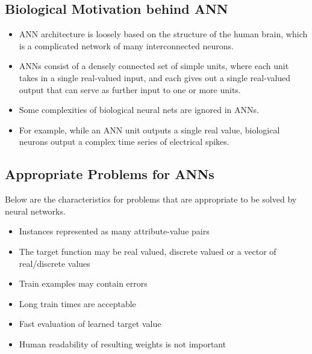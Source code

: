\documentclass{article}
\theoremstyle{plain}
\theoremstyle{definition}
\begin{document}
\subsection{Biological Motivation behind ANN}
\begin{itemize}
    \item ANN architecture is loosely based on the structure of the human brain, which is a complicated network of many interconnected neurons. 
    
    \item ANNs consist of a densely connected set of simple units, where each unit takes in a single real-valued input, and each gives out a single real-valued output that can serve as further input to one or more units. 
    
    \item Some complexities of biological neural nets are ignored in ANNs. 
    
    \item For example, while an ANN unit outputs a single real value, biological neurons output a complex time series of electrical spikes. 
\end{itemize}

\subsection{Appropriate Problems for ANNs}
Below are the characteristics for problems that are appropriate to be solved by neural networks.
\begin{itemize}
    \item Instances represented as many attribute-value pairs
    
    \item The target function may be real valued, discrete valued or a vector of real/discrete values
    
    \item Train examples may contain errors
    
    \item Long train times are acceptable
    
    \item Fast evaluation of learned target value
    
    \item Human readability of resulting weights is not important
\end{itemize}
\end{document}
